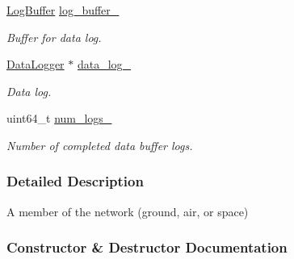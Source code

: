 \begin{DoxyCompactItemize}
\hyperlink{structosse_1_1collaborate_1_1_node_1_1_log_buffer}{Log\+Buffer} \hyperlink{classosse_1_1collaborate_1_1_node_a4ec904a63c911c1cbaf7dc880ad323f2}{log\+\_\+buffer\+\_\+}
\begin{DoxyCompactList}\small\item\em Buffer for data log. \end{DoxyCompactList}\item 
\mbox{\label{classosse_1_1collaborate_1_1_node_af0c3f012fb1c5986a893f64c107f411a}} 
\hyperlink{classosse_1_1collaborate_1_1_data_logger}{Data\+Logger} $\ast$ \hyperlink{classosse_1_1collaborate_1_1_node_af0c3f012fb1c5986a893f64c107f411a}{data\+\_\+log\+\_\+}
\begin{DoxyCompactList}\small\item\em Data log. \end{DoxyCompactList}\item 
\mbox{\label{classosse_1_1collaborate_1_1_node_a82f9514ee12e8fd9a63c3143d450e18f}} 
uint64\+\_\+t \hyperlink{classosse_1_1collaborate_1_1_node_a82f9514ee12e8fd9a63c3143d450e18f}{num\+\_\+logs\+\_\+}
\begin{DoxyCompactList}\small\item\em Number of completed data buffer logs. \end{DoxyCompactList}\end{DoxyCompactItemize}


\subsubsection{Detailed Description}
A member of the network (ground, air, or space) 

\subsubsection{Constructor \& Destructor Documentation}
\mbox{\label{classosse_1_1collaborate_1_1_node_ae2a5efe31854b5d48a5887eedfbdf741}} 
